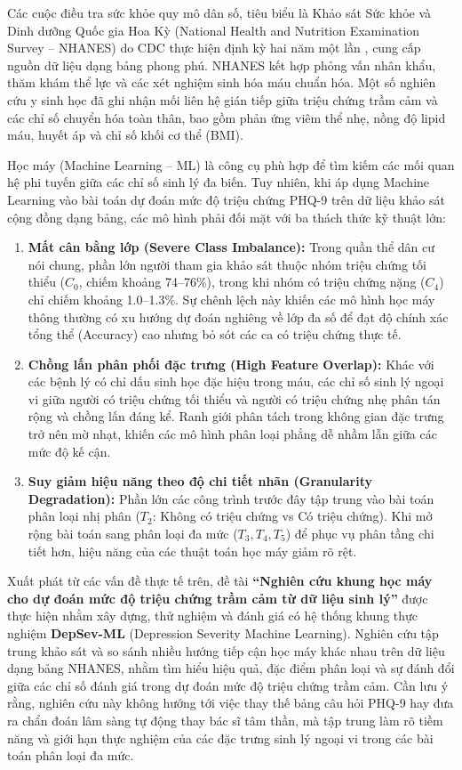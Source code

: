Các cuộc điều tra sức khỏe quy mô dân số, tiêu biểu là Khảo sát Sức khỏe và Dinh dưỡng Quốc gia Hoa Kỳ (National Health and Nutrition Examination Survey -- NHANES) do CDC thực hiện định kỳ hai năm một lần \cite{cdc2014nhanes, cdc2016nhanes}, cung cấp nguồn dữ liệu dạng bảng phong phú. NHANES kết hợp phỏng vấn nhân khẩu, thăm khám thể lực và các xét nghiệm sinh hóa máu chuẩn hóa. Một số nghiên cứu y sinh học đã ghi nhận mối liên hệ gián tiếp giữa triệu chứng trầm cảm và các chỉ số chuyển hóa toàn thân, bao gồm phản ứng viêm thể nhẹ, nồng độ lipid máu, huyết áp và chỉ số khối cơ thể (BMI).

Học máy (Machine Learning -- ML) là công cụ phù hợp để tìm kiếm các mối quan hệ phi tuyến giữa các chỉ số sinh lý đa biến. Tuy nhiên, khi áp dụng Machine Learning vào bài toán dự đoán mức độ triệu chứng PHQ-9 trên dữ liệu khảo sát cộng đồng dạng bảng, các mô hình phải đối mặt với ba thách thức kỹ thuật lớn:
\begin{enumerate}
    \item \textbf{Mất cân bằng lớp (Severe Class Imbalance):} Trong quần thể dân cư nói chung, phần lớn người tham gia khảo sát thuộc nhóm triệu chứng tối thiểu ($C_0$, chiếm khoảng 74--76\%), trong khi nhóm có triệu chứng nặng ($C_4$) chỉ chiếm khoảng 1.0--1.3\%. Sự chênh lệch này khiến các mô hình học máy thông thường có xu hướng dự đoán nghiêng về lớp đa số để đạt độ chính xác tổng thể (Accuracy) cao nhưng bỏ sót các ca có triệu chứng thực tế.
    \item \textbf{Chồng lấn phân phối đặc trưng (High Feature Overlap):} Khác với các bệnh lý có chỉ dấu sinh học đặc hiệu trong máu, các chỉ số sinh lý ngoại vi giữa người có triệu chứng tối thiểu và người có triệu chứng nhẹ phân tán rộng và chồng lấn đáng kể. Ranh giới phân tách trong không gian đặc trưng trở nên mờ nhạt, khiến các mô hình phân loại phẳng dễ nhầm lẫn giữa các mức độ kế cận.
    \item \textbf{Suy giảm hiệu năng theo độ chi tiết nhãn (Granularity Degradation):} Phần lớn các công trình trước đây tập trung vào bài toán phân loại nhị phân ($T_2$: Không có triệu chứng vs Có triệu chứng). Khi mở rộng bài toán sang phân loại đa mức ($T_3, T_4, T_5$) để phục vụ phân tầng chi tiết hơn, hiệu năng của các thuật toán học máy giảm rõ rệt.
\end{enumerate}

Xuất phát từ các vấn đề thực tế trên, đề tài \textbf{“Nghiên cứu khung học máy cho dự đoán mức độ triệu chứng trầm cảm từ dữ liệu sinh lý”} được thực hiện nhằm xây dựng, thử nghiệm và đánh giá có hệ thống khung thực nghiệm \textbf{DepSev-ML} (Depression Severity Machine Learning). Nghiên cứu tập trung khảo sát và so sánh nhiều hướng tiếp cận học máy khác nhau trên dữ liệu dạng bảng NHANES, nhằm tìm hiểu hiệu quả, đặc điểm phân loại và sự đánh đổi giữa các chỉ số đánh giá trong dự đoán mức độ triệu chứng trầm cảm. Cần lưu ý rằng, nghiên cứu này không hướng tới việc thay thế bảng câu hỏi PHQ-9 hay đưa ra chẩn đoán lâm sàng tự động thay bác sĩ tâm thần, mà tập trung làm rõ tiềm năng và giới hạn thực nghiệm của các đặc trưng sinh lý ngoại vi trong các bài toán phân loại đa mức.

